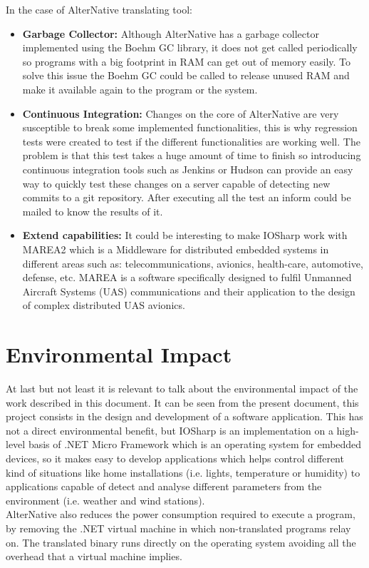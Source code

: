 In the case of AlterNative translating tool:
\begin{itemize}
\item \textbf{Garbage Collector:} Although AlterNative has a garbage collector implemented using the Boehm GC library, it does not get called periodically so programs with a big footprint in RAM can get out of memory easily. To solve this issue the Boehm GC could be called to release unused RAM and make it available again to the program or the system.

\item \textbf{Continuous Integration:} Changes on the core of AlterNative are very susceptible to break some implemented functionalities, this is why regression tests were created to test if the different functionalities are working well. The problem is that this test takes a huge amount of time to finish so introducing continuous integration tools such as Jenkins or Hudson can provide an easy way to quickly test these changes on a server capable of detecting new commits to a git repository. After executing all the test an inform could be mailed to know the results of it.

\item \textbf{Extend capabilities:} It could be interesting to make IOSharp work with MAREA2 which is a Middleware for distributed embedded systems in different areas such as: telecommunications, avionics, health-care, automotive, defense, etc. MAREA is a software specifically designed to fulfil Unmanned Aircraft Systems (UAS) communications and their application to the design of complex distributed UAS avionics.
\end{itemize}

\section{Environmental Impact}\label{S:Environmental-Impact}
At last but not least it is relevant to talk about the environmental impact of the work described in this document. It can be seen from the present document, this project consists in the design and development of a software application. This has not a direct environmental benefit, but IOSharp is an implementation on a high-level basis of .NET Micro Framework which is an operating system for embedded devices, so it makes easy to develop applications which helps control different kind of situations like home installations (i.e. lights, temperature or humidity) to applications capable of detect and analyse different parameters from the environment (i.e. weather and wind stations).
\\
AlterNative also reduces the power consumption required to execute a program, by removing the .NET virtual machine in which non-translated programs relay on. The translated binary runs directly on the operating system avoiding all the overhead that a virtual machine implies.